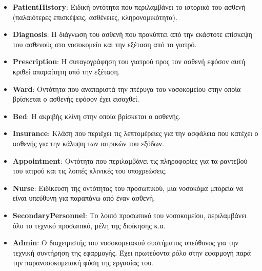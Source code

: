 \documentclass{article}
\begin{document}
\begin{itemize}
    \item \textbf{PatientHistory}: Ειδική οντότητα που περιλαμβάνει το ιστορικό του ασθενή (παλαιότερες επισκέψεις, ασθένειες, κληρονομικότητα).
    \item \textbf{Diagnosis}: Η διάγνωση του ασθενή που προκύπτει από την εκάστοτε επίσκεψη του ασθενούς στο νοσοκομείο και την εξέταση από το γιατρό.
    \item \textbf{Prescription}: Η συταγογράφηση του γιατρού προς τον ασθενή εφόσον αυτή κριθεί απαραίτητη από την εξέταση.
    \item \textbf{Ward}: Οντότητα που αναπαριστά την πτέρυγα του νοσοκομείου στην οποία βρίσκεται ο ασθενής εφόσον έχει εισαχθεί.
    \item \textbf{Bed}: Η ακριβής κλίνη στην οποία βρίσκεται ο ασθενής.
    \item \textbf{Insurance}: Κλάση που περιέχει τις λεπτομέρειες για την ασφάλεια που κατέχει ο ασθενής για την κάλυψη των ιατρικών του εξόδων.
    \item \textbf{Appointment}: Οντότητα που περιλαμβάνει τις πληροφορίες για τα ραντεβού του ιατρού και τις λοιπές κλινικές του υποχρεώσεις.
    \item \textbf{Nurse}: Ειδίκευση της οντότητας του προσωπικού, μια νοσοκόμα μπορεία να είναι υπεύθυνη για παραπάνω από έναν ασθενή.
    \item \textbf{SecondaryPersonnel}: Το λοιπό προσωπικό του νοσοκομείου, περιλαμβάνει όλο το τεχνικό προσωπικό, μέλη της διοίκησης κ.α.
    \item\textbf{Admin}: Ο διαχειριστής του νοσοκομειακού συστήματος υπεύθυνος για την τεχνική συντήρηση της εφαρμογής. Έχει πρωτεύοντα ρόλο στην εφαρμογή παρά την παρανοσοκομειακή φύση της εργασίας του.
\end{itemize}
\end{document}
